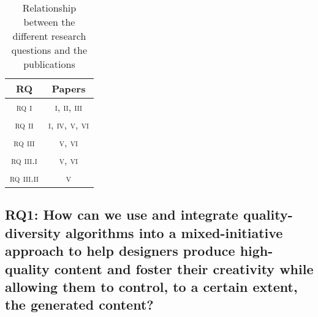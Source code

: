 \begin{table}[h]
\centering
\caption{Relationship between the different research questions and the publications}\label{table:RQPapers}
\begin{tabular}{|c|c|}
\hline
\rule{0pt}{12pt}
RQ&Papers\\ \hline
\textsc{rq i} & \textsc{i, ii, iii}\\ \hline
\textsc{rq ii} & \textsc{i, iv, v, vi}\\ \hline
\textsc{rq iii} & \textsc{v, vi}\\ \hline
\textsc{rq iii.i} & \textsc{v, vi}\\ \hline
\textsc{rq iii.ii} & \textsc{v}\\ \hline
\end{tabular}
\end{table}
\bigskip



\subsection[Research Question 1]{RQ1: How can we use and integrate quality-diversity algorithms into a mixed-initiative approach to help designers produce high-quality content and foster their creativity while allowing them to control, to a certain extent, the generated content?}


